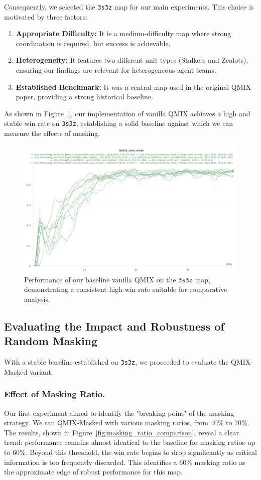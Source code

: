 \documentclass[../Main.tex]{subfiles}
\begin{document}
Consequently, we selected the \texttt{3s3z} map for our main experiments. This choice is motivated by three factors:
\begin{enumerate}
    \item \textbf{Appropriate Difficulty:} It is a medium-difficulty map where strong coordination is required, but success is achievable.
    \item \textbf{Heterogeneity:} It features two different unit types (Stalkers and Zealots), ensuring our findings are relevant for heterogeneous agent teams.
    \item \textbf{Established Benchmark:} It was a central map used in the original QMIX paper, providing a strong historical baseline.
\end{enumerate}

As shown in Figure~\ref{fig:baseline_2s3z}, our implementation of vanilla QMIX achieves a high and stable win rate on \texttt{3s3z}, establishing a solid baseline against which we can measure the effects of masking.

\begin{figure}[H]
    \centering
    \includegraphics[width=0.6\linewidth]{img/results-analysis/2s3z-baseline.png} %
    \caption{Performance of our baseline vanilla QMIX on the \texttt{3s3z} map, demonstrating a consistent high win rate suitable for comparative analysis.}
    \label{fig:baseline_2s3z}
\end{figure}

\subsection{Evaluating the Impact and Robustness of Random Masking}
With a stable baseline established on \texttt{3s3z}, we proceeded to evaluate the QMIX-Masked variant.

\subsubsection{Effect of Masking Ratio.}
Our first experiment aimed to identify the "breaking point" of the masking strategy. We ran QMIX-Masked with various masking ratios, from 40\% to 70\%. The results, shown in Figure~\ref{fig:masking_ratio_comparison}, reveal a clear trend: performance remains almost identical to the baseline for masking ratios up to 60\%. Beyond this threshold, the win rate begins to drop significantly as critical information is too frequently discarded. This identifies a 60\% masking ratio as the approximate edge of robust performance for this map.
\end{document}
